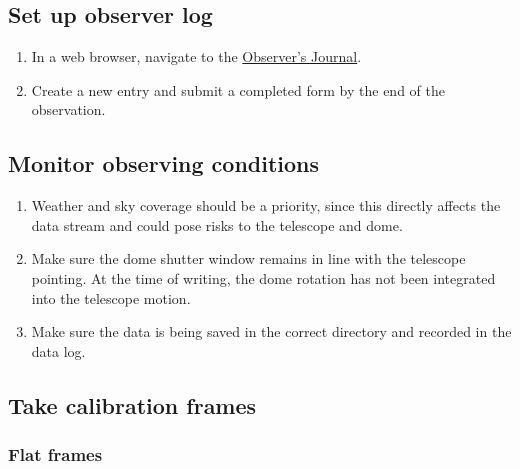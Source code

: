 \documentclass{article}
\begin{document}
	\subsection{Set up observer log}
	\label{sec:set-up-observer-log}
	
	\begin{enumerate}
		
		\item In a web browser, navigate to the \href{https://forms.office.com/pages/responsepage.aspx?id=pjYEmd-HHEmRJJr6kfiIJ6_-JTSTSFFHivQ4LTyBzxRUNjk5SEFNSkY1QzA2UlMwVUdUR1ROUVpCSS4u}{Observer's Journal}.
		
		\item Create a new entry and submit a completed form by the end of the observation.
		
	\end{enumerate}
	
	\subsection{Monitor observing conditions}
	\label{sec:monitor-observing-conditions}
	
	\begin{enumerate}
		
		\item Weather and sky coverage should be a priority, since this directly affects the data stream and could pose risks to the telescope and dome.
		
		\item Make sure the dome shutter window remains in line with the telescope pointing. At the time of writing, the dome rotation has not been integrated into the telescope motion.
		
		\item Make sure the data is being saved in the correct directory and recorded in the data log.
		
	\end{enumerate}
	
	\subsection{Take calibration frames}
	\label{sec:take-calibration-frames}
	
	\subsubsection{Flat frames}
	\label{sec:flat-frames}
	
\end{document}
